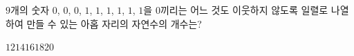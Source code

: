 \hspace*{2mm}\begin{minipage}[t]{\dimexpr\linewidth-2mm\relax}\vspace{0pt}
$9$개의 숫자 $0$, $0$, $0$, $1$, $1$, $1$, $1$, $1$, $1$을 $0$끼리는 어느 것도 이웃하지 않도록 일렬로 나열하여 만들 수 있는 아홉 자리의 자연수의 개수는?
\begin{choices32}{$12$}{$14$}{$16$}{$18$}{$20$}\end{choices32}\end{minipage}
